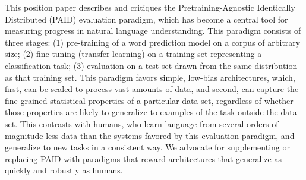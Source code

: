 This position paper describes and critiques the Pretraining-Agnostic Identically Distributed (PAID) evaluation paradigm, which has become a central tool for measuring progress in natural language understanding. This paradigm consists of three stages: (1) pre-training of a word prediction model on a corpus of arbitrary size; (2) fine-tuning (transfer learning) on a training set representing a classification task; (3) evaluation on a test set drawn from the same distribution as that training set. This paradigm favors simple, low-bias architectures, which, first, can be scaled to process vast amounts of data, and second, can capture the fine-grained statistical properties of a particular data set, regardless of whether those properties are likely to generalize to examples of the task outside the data set. This contrasts with humans, who learn language from several orders of magnitude less data than the systems favored by this evaluation paradigm, and generalize to new tasks in a consistent way. We advocate for supplementing or replacing PAID with paradigms that reward architectures that generalize as quickly and robustly as humans.
